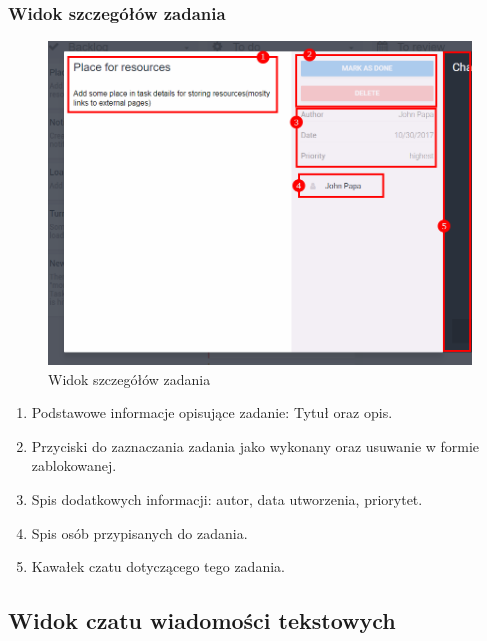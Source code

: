 \documentclass[eng,printmode]{mgr}
\begin{document}
\subsubsection{Widok szczegółów zadania}
\begin{figure}[H]
  \begin{center}
  \includegraphics[scale=0.66]{task_details}
  \end{center}
  \caption{Widok szczegółów zadania}
\end{figure}
\begin{enumerate}
  \item Podstawowe informacje opisujące zadanie: Tytuł oraz opis.
  \item Przyciski do zaznaczania zadania jako wykonany oraz usuwanie w formie zablokowanej.
  \item Spis dodatkowych informacji: autor, data utworzenia, priorytet.
  \item Spis osób przypisanych do zadania.
  \item Kawałek czatu dotyczącego tego zadania.
\end{enumerate}
\newpage
\subsection{Widok czatu wiadomości tekstowych}
\end{document}
